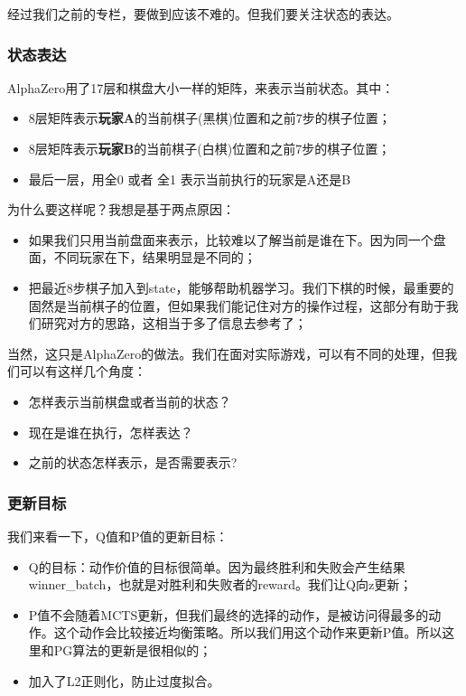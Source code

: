 \documentclass[12pt]{article}
\begin{document}
经过我们之前的专栏，要做到应该不难的。但我们要关注状态的表达。

\subsubsection{状态表达}
AlphaZero用了17层和棋盘大小一样的矩阵，来表示当前状态。其中：
\begin{itemize}
\setlength{\itemsep}{0pt}
\setlength{\parsep}{0pt}
\setlength{\parskip}{0pt}
    \item 8层矩阵表示\textbf{玩家A}的当前棋子(黑棋)位置和之前7步的棋子位置；
    \item 8层矩阵表示\textbf{玩家B}的当前棋子(白棋)位置和之前7步的棋子位置；
    \item 最后一层，用全0 或者 全1 表示当前执行的玩家是A还是B
\end{itemize}

为什么要这样呢？我想是基于两点原因：
\begin{itemize}
\setlength{\itemsep}{0pt}
\setlength{\parsep}{0pt}
\setlength{\parskip}{0pt}
    \item 如果我们只用当前盘面来表示，比较难以了解当前是谁在下。因为同一个盘面，不同玩家在下，结果明显是不同的；
    \item 把最近8步棋子加入到state，能够帮助机器学习。我们下棋的时候，最重要的固然是当前棋子的位置，但如果我们能记住对方的操作过程，这部分有助于我们研究对方的思路，这相当于多了信息去参考了；
\end{itemize}

当然，这只是AlphaZero的做法。我们在面对实际游戏，可以有不同的处理，但我们可以有这样几个角度：
\begin{itemize}
\setlength{\itemsep}{0pt}
\setlength{\parsep}{0pt}
\setlength{\parskip}{0pt}
    \item 怎样表示当前棋盘或者当前的状态？
    \item 现在是谁在执行，怎样表达？
    \item 之前的状态怎样表示，是否需要表示?
\end{itemize}

\subsubsection{更新目标}
我们来看一下，Q值和P值的更新目标：
\begin{itemize}
\setlength{\itemsep}{0pt}
\setlength{\parsep}{0pt}
\setlength{\parskip}{0pt}
    \item Q的目标：动作价值的目标很简单。因为最终胜利和失败会产生结果winner\_batch，也就是对胜利和失败者的reward。我们让Q向z更新；
    \item P值不会随着MCTS更新，但我们最终的选择的动作，是被访问得最多的动作。这个动作会比较接近均衡策略。所以我们用这个动作来更新P值。所以这里和PG算法的更新是很相似的；
    \item 加入了L2正则化，防止过度拟合。
\end{itemize}
\end{document}
